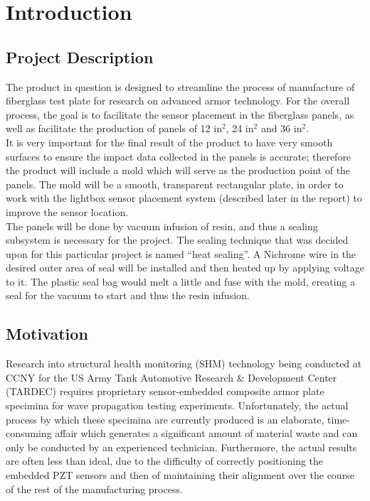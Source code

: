 \documentclass[12pt,letterpaper,notitlepage]{article}
\begin{document}
\section{Introduction}
\subsection{Project Description}
The product in question is designed to streamline the process of manufacture of fiberglass test plate for research on advanced armor technology. For the overall process, the goal is to facilitate the sensor placement in the fiberglass panels, as well as facilitate the production of panels of 12 in$^2$, 24 in$^2$ and 36 in$^2$.\\

It is very important for the final result of the product to have very smooth surfaces to ensure the impact data collected in the panels is accurate; therefore the product will include a mold which will serve as the production point of the panels. The mold will be a smooth, transparent rectangular plate, in order to work with the lightbox sensor placement system (described later in the report) to improve the sensor location.\\

The panels will be done by vacuum infusion of resin, and thus a sealing subsystem is necessary for the project. The sealing technique that was decided upon for this particular project is named ``heat sealing''. A Nichrome wire in the desired outer area of seal will be installed and then heated up by applying voltage to it. The plastic seal bag would melt a little and fuse with the mold, creating a seal for the vacuum to start and thus the resin infusion.\\
\subsection{Motivation}
Research into structural health monitoring (SHM) technology being conducted at CCNY for the US Army Tank Automotive Research \& Development Center (TARDEC) requires proprietary sensor-embedded composite armor plate specimina for wave propagation testing experiments. Unfortunately, the actual process by which these specimina are currently produced is an elaborate, time-consuming affair which generates a significant amount of material waste and can only be conducted by an experienced technician. Furthermore, the actual results are often less than ideal, due to the difficulty of correctly positioning the embedded PZT sensors and then of maintaining their alignment over the course of the rest of the manufacturing process.\\
\end{document}
